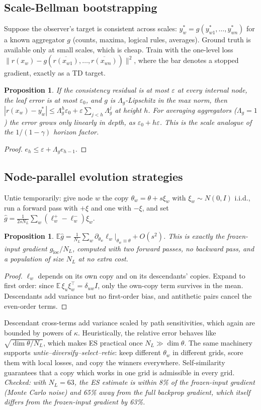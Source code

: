 \documentclass[11pt]{article}
\newtheorem{proposition}[theorem]{Proposition}
\theoremstyle{definition}
\newcommand{\E}{\mathbb{E}}
\newcommand{\eps}{\varepsilon}
\newcommand{\Nint}{N_{L}}
\newcommand{\norm}[1]{\lVert #1\rVert}
\begin{document}
\subsection{Scale-Bellman bootstrapping}\label{sec:bellman}
Suppose the observer's target is consistent across scales: $y^*_w=g(y^*_{w1},\dots,y^*_{wn})$
for a known aggregator $g$ (counts, maxima, logical rules, averages). Ground truth is available
only at small scales, which is cheap. Train with the one-level loss
$\norm{r(x_w)-g(\overline{r(x_{w1})},\dots,\overline{r(x_{wn})})}^2$, where the bar denotes a
stopped gradient, exactly as a TD target.

\begin{proposition}\label{prop:bellman}
If the consistency residual is at most $\eps$ at every internal node, the leaf error is at most
$\eps_0$, and $g$ is $\Lambda_g$-Lipschitz in the max norm, then
$|r(x_w)-y^*_w|\le\Lambda_g^{h}\eps_0+\eps\sum_{j<h}\Lambda_g^j$ at height $h$. For averaging
aggregators ($\Lambda_g=1$) the error grows only linearly in depth, as $\eps_0+h\eps$. This is the
scale analogue of the $1/(1-\gamma)$ horizon factor.
\end{proposition}
\begin{proof}$e_h\le\eps+\Lambda_g e_{h-1}$.\end{proof}

\subsection{Node-parallel evolution strategies}\label{sec:es}
Untie temporarily: give node $w$ the copy $\theta_w=\theta+s\xi_w$ with $\xi_w\sim N(0,I)$
i.i.d., run a forward pass with $+\xi$ and one with $-\xi$, and set
$\hat g=\frac1{2s\Nint}\sum_w(\ell^+_w-\ell^-_w)\xi_w$.
\begin{proposition}\label{prop:es}
$\E\hat g=\frac1{\Nint}\sum_w\partial_{\theta_w}\ell_w\big|_{\theta_w\equiv\theta}+O(s^2)$.
This is exactly the frozen-input gradient $g_{\mathrm{loc}}/\Nint$, computed with two forward
passes, no backward pass, and a population of size $\Nint$ at no extra cost.
\end{proposition}
\begin{proof}
$\ell_w$ depends on its own copy and on its descendants' copies. Expand to first order: since
$\E\,\xi_u\xi_w^\top=\delta_{uw}I$, only the own-copy term survives in the mean. Descendants add
variance but no first-order bias, and antithetic pairs cancel the even-order terms.
\end{proof}
\noindent Descendant cross-terms add variance scaled by path sensitivities, which again are
bounded by powers of $\kappa$. Heuristically, the relative error behaves like
$\sqrt{\dim\theta/\Nint}$, which makes ES practical once $\Nint\gg\dim\theta$. The same
machinery supports \emph{untie--diversify--select--retie}: keep different $\theta_w$ in
different grids, score them with local losses, and copy the winners everywhere. Self-similarity
guarantees that a copy which works in one grid is admissible in every grid.
\emph{Checked: with $\Nint=63$, the ES estimate is within 8\% of the frozen-input gradient
(Monte Carlo noise) and 65\% away from the full backprop gradient, which itself differs from
the frozen-input gradient by 63\%.}
\end{document}
